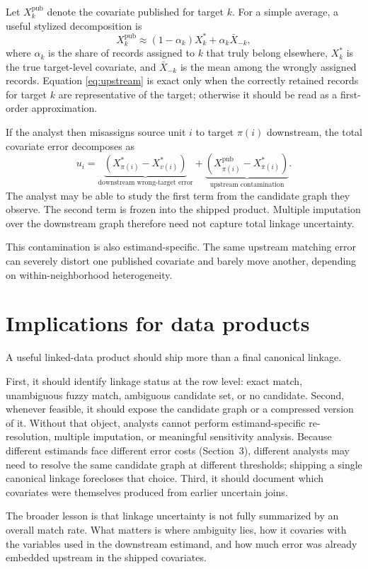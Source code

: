 \documentclass[12pt]{article}
\theoremstyle{remark}
\begin{document}
Let $X_k^{\mathrm{pub}}$ denote the covariate published for target $k$. For a simple average, a useful stylized decomposition is
\begin{equation}
X_k^{\mathrm{pub}}
\approx
(1-\alpha_k)X_k^*+\alpha_k\bar X_{-k},
\label{eq:upstream}
\end{equation}
where $\alpha_k$ is the share of records assigned to $k$ that truly belong elsewhere, $X_k^*$ is the true target-level covariate, and $\bar X_{-k}$ is the mean among the wrongly assigned records. Equation \eqref{eq:upstream} is exact only when the correctly retained records for target $k$ are representative of the target; otherwise it should be read as a first-order approximation.

If the analyst then misassigns source unit $i$ to target $\pi(i)$ downstream, the total covariate error decomposes as
\[
u_i
=
\underbrace{(X_{\pi(i)}^*-X_{v(i)}^*)}_{\text{downstream wrong-target error}}
+
\underbrace{(X_{\pi(i)}^{\mathrm{pub}}-X_{\pi(i)}^*)}_{\text{upstream contamination}}.
\]
The analyst may be able to study the first term from the candidate graph they observe. The second term is frozen into the shipped product. Multiple imputation over the downstream graph therefore need not capture total linkage uncertainty.

This contamination is also estimand-specific. The same upstream matching error can severely distort one published covariate and barely move another, depending on within-neighborhood heterogeneity.

\section{Implications for data products}

A useful linked-data product should ship more than a final canonical linkage.

First, it should identify linkage status at the row level: exact match, unambiguous fuzzy match, ambiguous candidate set, or no candidate. Second, whenever feasible, it should expose the candidate graph or a compressed version of it. Without that object, analysts cannot perform estimand-specific re-resolution, multiple imputation, or meaningful sensitivity analysis. Because different estimands face different error costs (Section~3), different analysts may need to resolve the same candidate graph at different thresholds; shipping a single canonical linkage forecloses that choice. Third, it should document which covariates were themselves produced from earlier uncertain joins.

The broader lesson is that linkage uncertainty is not fully summarized by an overall match rate. What matters is where ambiguity lies, how it covaries with the variables used in the downstream estimand, and how much error was already embedded upstream in the shipped covariates.



\end{document}
